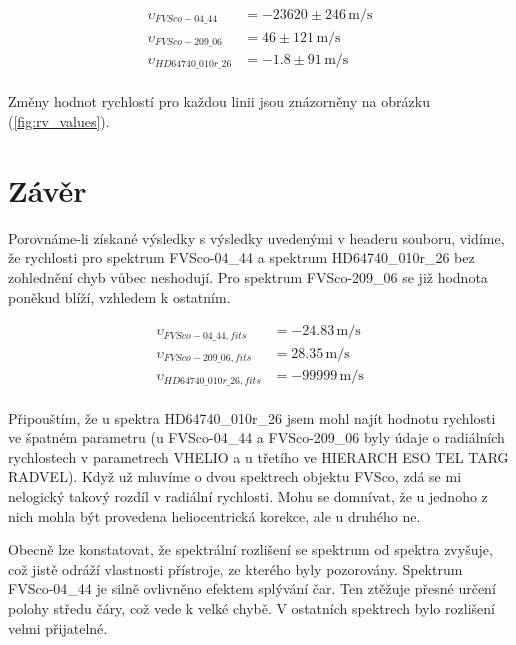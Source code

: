 \documentclass[a4paper,11pt,twocolumn]{article}
\begin{document}
        \begin{equation*}
            \begin{split}
                \upsilon_{FVSco-04\_44} &= -23620 \pm 246 \, \si{\meter\per\second} \\
                \upsilon_{FVSco-209\_06} &= 46 \pm 121 \, \si{\meter\per\second} \\
                \upsilon_{HD64740\_010r\_26} &= -1.8 \pm 91 \, \si{\meter\per\second} \\
            \end{split}
        \end{equation*}

        Změny hodnot rychlostí pro každou linii jsou znázorněny na obrázku (\ref{fig:rv_values}).

        
    \section{Závěr}
        Porovnáme-li získané výsledky s výsledky uvedenými v headeru souboru, vidíme, že rychlosti pro spektrum FVSco-04\_44 a spektrum HD64740\_010r\_26 bez zohlednění chyb vůbec neshodují. Pro spektrum FVSco-209\_06 se již hodnota poněkud blíží, vzhledem k ostatním.
        
        \begin{equation*}
            \begin{split}
                \upsilon_{FVSco-04\_44, fits} &= -24.83 \, \si{\meter\per\second} \\
                \upsilon_{FVSco-209\_06, fits} &= 28.35 \, \si{\meter\per\second} \\
                \upsilon_{HD64740\_010r\_26, fits} &= -99999 \, \si{\meter\per\second} \\
            \end{split}
        \end{equation*}

        Připouštím, že u spektra HD64740\_010r\_26 jsem mohl najít hodnotu rychlosti ve špatném parametru (u FVSco-04\_44 a FVSco-209\_06 byly údaje o radiálních rychlostech v parametrech VHELIO a u třetího ve HIERARCH ESO TEL TARG RADVEL). 
        Když už mluvíme o dvou spektrech objektu FVSco, zdá se mi nelogický takový rozdíl v radiální rychlosti. Mohu se domnívat, že u jednoho z nich mohla být provedena heliocentrická korekce, ale u druhého ne. 

        Obecně lze konstatovat, že spektrální rozlišení se spektrum od spektra zvyšuje, což jistě odráží vlastnosti přístroje, ze kterého byly pozorovány. Spektrum FVSco-04\_44 je silně ovlivněno efektem splývání čar. Ten ztěžuje přesné určení polohy středu čáry, což vede k velké chybě. V ostatních spektrech bylo rozlišení velmi přijatelné. 
        
\end{document}

